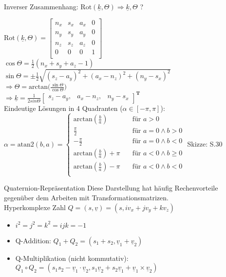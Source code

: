 \documentclass[a4paper,landscape,6pt]{article}
\newcommand{\ma}[1]{\ensuremath{\boldsymbol {#1}}}								%
\newcommand{\mat}[1]{\ensuremath{\begin{bmatrix} #1 \end{bmatrix}}}				%
\newcommand{\ul}[1]{\underline{#1}}
\begin{document}
\begin{multicols}{3}
Inverser Zusammenhang: $\text{Rot}(\ul k,\Theta) \Rightarrow \ul k , \Theta$ ?

$\text{Rot}(\ul k,\Theta) =
\mat{n_x & s_x & a_x & 0 \\
	n_y & s_y & a_y & 0 \\
	n_z & s_z & a_z & 0 \\
	0 & 0 & 0 & 1 \\ }$\\
$\cos\Theta = \frac{1}{2}(n_x + s_y + a_z -1)$\\
$\sin\Theta = \pm \frac{1}{2}\sqrt{(s_z - a_y)^2 + (a_x - n_z)^2 + (n_y - s_x)^2}$\\
$\boxed{ \Rightarrow \Theta = \text{arctan}\big( \frac{\sin\Theta}{\cos\Theta} \big) }$\\
$\boxed{ \Rightarrow \ul k = \frac{1}{2sin\Theta} \mat{s_z - a_y ,& a_x - n_z ,& n_y - s_x}^{\ma T} }$\\

Eindeutige Lösungen in 4 Quadranten ($\alpha \in [-\pi, \pi]$):\\

$\alpha = \text{atan2}(b,a) = \left\{
\begin{array}{cl}
\text{arctan}(\frac{b}{a}) & \quad \text{für } a > 0 \\
\frac{\pi}{2} & \quad  \text{für } a = 0 \wedge b > 0 \\
-\frac{\pi}{2} & \quad  \text{für } a = 0 \wedge b < 0 \\
\text{arctan}(\frac{b}{a}) + \pi & \quad \text{für } a < 0 \wedge b \ge 0 \\
\text{arctan}(\frac{b}{a}) - \pi & \quad \text{für } a < 0 \wedge b < 0 \\
\end{array} \right. $
Skizze: S.30
\newpage
\begin{infobox}{Quaternion-Repräsentation}
Diese Darstellung hat häufig Rechenvorteile gegenüber dem Arbeiten mit Transformationsmatrizen.\\
Hyperkomplexe Zahl $Q = (s, \ul v) = (s, i v_x + j v_y + k v_z)$\\
\begin{itemize}
	\item $i^2 = j^2 = k^2 = ijk = -1$
	\item Q-Addition: $Q_1 + Q_2 = (s_1 + s_2, \ul v_1 + \ul v_2)$
	\item Q-Multiplikation (nicht kommutativ):\\$Q_1 \circ Q_2 = (s_1 s_2 - \ul v_1 \cdot \ul v_2, s_1 \ul v_2 + s_2 \ul v_1 + \ul v_1 \times \ul v_2)$\\
	

\end{itemize}
\end{infobox}
\end{multicols}
\end{document}
